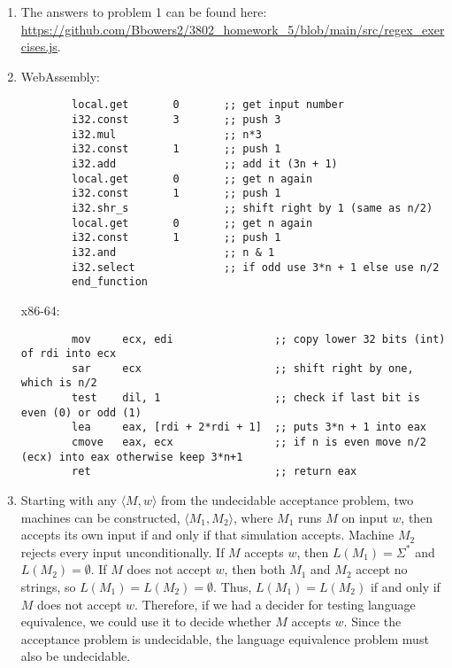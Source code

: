 \documentclass[11pt, letterpaper]{article}
\begin{document}
\begin{enumerate}
    \item The answers to problem 1 can be found here: \url{https://github.com/Bbowers2/3802_homework_5/blob/main/src/regex_exercises.js}.
    
    \item WebAssembly:
    \begin{lstlisting}
        local.get       0       ;; get input number
        i32.const       3       ;; push 3
        i32.mul                 ;; n*3
        i32.const       1       ;; push 1
        i32.add                 ;; add it (3n + 1)
        local.get       0       ;; get n again
        i32.const       1       ;; push 1
        i32.shr_s               ;; shift right by 1 (same as n/2)
        local.get       0       ;; get n again
        i32.const       1       ;; push 1
        i32.and                 ;; n & 1
        i32.select              ;; if odd use 3*n + 1 else use n/2
        end_function
        \end{lstlisting}

    x86-64:
    \begin{lstlisting}
        mov     ecx, edi                ;; copy lower 32 bits (int) of rdi into ecx
        sar     ecx                     ;; shift right by one, which is n/2
        test    dil, 1                  ;; check if last bit is even (0) or odd (1)
        lea     eax, [rdi + 2*rdi + 1]  ;; puts 3*n + 1 into eax
        cmove   eax, ecx                ;; if n is even move n/2 (ecx) into eax otherwise keep 3*n+1
        ret                             ;; return eax
        \end{lstlisting}

    \item Starting with any $\langle M, w \rangle$ from the undecidable acceptance problem, two machines can be constructed, $\langle M_1, M_2 \rangle$, where $M_1$ runs $M$ on input $w$, then accepts its own input if and only if that simulation accepts. Machine $M_2$ rejects every input unconditionally. If $M$ accepts $w$, then $L(M_1) = \Sigma^*$ and $L(M_2) = \emptyset$. If $M$ does not accept $w$, then both $M_1$ and $M_2$ accept no strings, so $L(M_1) = L(M_2) = \emptyset$. Thus, $L(M_1) = L(M_2)$ if and only if $M$ does not accept $w$. Therefore, if we had a decider for testing language equivalence, we could use it to decide whether $M$ accepts $w$. Since the acceptance problem is undecidable, the language equivalence problem must also be undecidable.
\end{enumerate}
\end{document}
